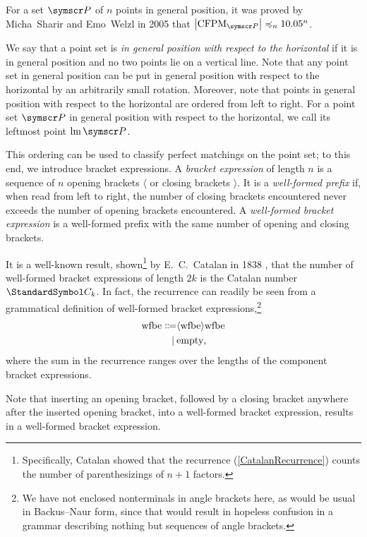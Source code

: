 For a set $\pointset P$ of $n$ points in general position, it was proved by Micha~Sharir and Emo~Welzl in 2005
\cite{SharirWelzl2006} that $\Cardinality{\CFPM_{\pointset P}} \preccurlyeq_n 10.05^n$.


We say that a point set is \emph{in general position with respect to the horizontal} if it
is in general position and no two points lie on a vertical line. Note that any point set in
general position can be put in general position with respect to the horizontal by an arbitrarily
small rotation. Moreover, note that points in general position with respect to the horizontal
are ordered from left to right.
For a point set $\pointset P$ in general position with respect to the horizontal, we call its
leftmost point $\leftmost\pointset P$.

This ordering can be used to classify perfect matchings on the point set; to this end,
we introduce bracket expressions.
A \emph{bracket expression} of length $n$ is a sequence of $n$ opening brackets $\langle$ or closing
brackets $\rangle$.
It is a \emph{well-formed prefix} if, when read from left to right, the number of closing brackets
encountered never exceeds the number of opening brackets encountered.
A \emph{well-formed bracket expression} is a well-formed prefix with the same number of opening and
closing brackets.

It is a well-known result, shown\footnote{Specifically, Catalan showed that the recurrence (\ref{CatalanRecurrence})
counts the number of parenthesizings of $n+1$ factors.} by E.~C.~Catalan in 1838 \cite{Catalan1838}, that the
number of well-formed bracket expressions
of length $2k$ is the Catalan number $\CatalanNumber k$. In fact, the recurrence can readily be seen from
a grammatical definition of well-formed bracket expressions,\footnote{We have not enclosed nonterminals
in angle brackets here, as would be usual in Backus--Naur form, since that would result in hopeless
confusion in a grammar describing nothing but sequences of angle brackets.}\begin{align*}
\text{wfbe} \Coloneq
& \langle \text{wfbe} \rangle \text{wfbe} \\
\mid\: & \text{empty}\text,
\end{align*}
where the sum in the recurrence ranges over the lengths of the component bracket expressions.

Note that inserting an opening bracket, followed by a closing bracket anywhere after the
inserted opening bracket, into a well-formed bracket expression, results in a well-formed bracket
expression.

